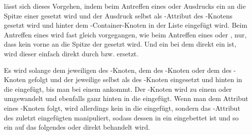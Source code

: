 
\begin{Special_Paragraph}
 lässt sich dieses Vorgehen, indem beim Antreffen eines  oder  Ausdrucks ein  an die Spitze einer  gesetzt wird und der Ausdruck selbst als -Attribut des -Knotens gesetzt wird und hinter dem -Container-Knoten in der Liste eingefügt wird. Beim Antreffen eines  wird fast gleich vorgegangen, wie beim Antreffen eines  oder , nur, dass kein  vorne an die Spitze der  gesetzt wird. Und ein  bei dem  direkt ein   ist, wird dieser einfach direkt durch  bzw.  ersetzt.

Es wird solange dem jeweiligen  des -Knoten, dem  des -Knoten oder dem  des -Knoten gefolgt und der jeweilige  selbst als  des -Knoten eingesetzt und hinten in die  eingefügt, bis man bei einem  ankommt. Der -Knoten wird zu einem  oder  umgewandelt und ebenfalls ganz hinten in die  eingefügt.
Wenn man dem  Attribut eines -Knoten folgt, wird allerdings kein  in die  eingefügt, sondern das -Attribut des zuletzt eingefügten   manipuliert, sodass dessen  in ein  eingebettet ist und so ein auf das   folgendes  oder  direkt behandelt wird.


\end{Special_Paragraph}
